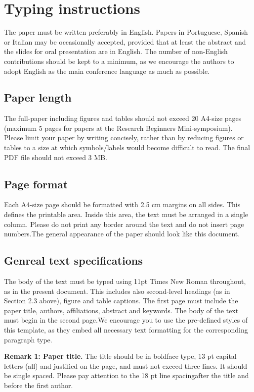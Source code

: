 \documentclass{cilamce19}
\begin{document}
\section{Typing instructions}

The paper must be written preferably in English. Papers in Portuguese, Spanish or Italian may be occasionally accepted, provided that at least the abstract and the slides for oral presentation are in English. The number of non-English contributions should be kept to a minimum, as we encourage the authors to adopt English as the main conference language as much as possible.

\subsection{Paper length} 
The full-paper including figures and tables should not exceed 20 A4-size pages (maximum 5 pages for papers at the Research Beginners Mini-symposium). Please limit your paper by writing concisely, rather than by reducing figures or tables to a size at which symbols/labels would become difficult to read. The final PDF file should not exceed 3 MB.



\subsection{Page format}
Each A4-size page should be formatted with 2.5 cm margins on all sides. This defines the printable area. Inside this area, the text must be arranged in a single column. Please do not print any border around the text and do not insert page numbers.The general appearance of the paper should look like this document.


\subsection{Genreal text specifications}
The body of the text must be typed using 11pt Times New Roman throughout, as in the present document. This includes also second-level headings (as in Section 2.3 above), figure and table captions. The first page must include the paper title, authors, affiliations, abstract and keywords. The body of the text must begin in the second page.We encourage you to use the pre-defined styles of this template, as they embed all necessary text formatting for the corresponding paragraph type.


\textbf{Remark 1: Paper title.} The title should be in boldface type, 13 pt capital letters (all) and justified on the page, and must not exceed three lines. It should be single spaced. Please pay attention to the 18 pt line spacingafter the title and before the first author.
\end{document}
